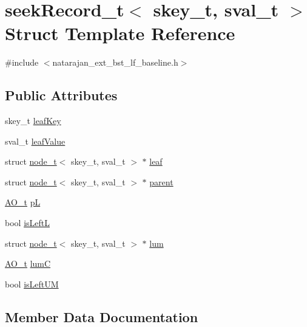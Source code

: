 \hypertarget{structseekRecord__t}{}\section{seek\+Record\+\_\+t$<$ skey\+\_\+t, sval\+\_\+t $>$ Struct Template Reference}
\label{structseekRecord__t}


{\ttfamily \#include $<$natarajan\+\_\+ext\+\_\+bst\+\_\+lf\+\_\+baseline.\+h$>$}

\subsection*{Public Attributes}
\begin{DoxyCompactItemize}
\item 
skey\+\_\+t \hyperlink{structseekRecord__t_a242a55734b296c6b87d55848277b61ee}{leaf\+Key}
\item 
sval\+\_\+t \hyperlink{structseekRecord__t_a0dcdcf40b44d819c423485031c192da0}{leaf\+Value}
\item 
struct \hyperlink{structnode__t}{node\+\_\+t}$<$ skey\+\_\+t, sval\+\_\+t $>$ $\ast$ \hyperlink{structseekRecord__t_a05edd77abc8e8960567d3dcc11faa6da}{leaf}
\item 
struct \hyperlink{structnode__t}{node\+\_\+t}$<$ skey\+\_\+t, sval\+\_\+t $>$ $\ast$ \hyperlink{structseekRecord__t_a7ff4a49b56e97553713f4ffa9ebb9762}{parent}
\item 
\hyperlink{atomic__ops_8h_a5225fef4d9eee821e82382cd269160dd}{A\+O\+\_\+t} \hyperlink{structseekRecord__t_a9b2f8a0ea21818115cd1df8bd43e3805}{pL}
\item 
bool \hyperlink{structseekRecord__t_a9ef03a6e44702813747a68e7ca743e14}{is\+LeftL}
\item 
struct \hyperlink{structnode__t}{node\+\_\+t}$<$ skey\+\_\+t, sval\+\_\+t $>$ $\ast$ \hyperlink{structseekRecord__t_ae1253c37644bed48ae50a7fbc10c8604}{lum}
\item 
\hyperlink{atomic__ops_8h_a5225fef4d9eee821e82382cd269160dd}{A\+O\+\_\+t} \hyperlink{structseekRecord__t_a1849a6fcb4ef24205344d35670ba56a3}{lumC}
\item 
bool \hyperlink{structseekRecord__t_aaea126d180e89701b44b673cd2d30d36}{is\+Left\+UM}
\end{DoxyCompactItemize}


\subsection{Member Data Documentation}
\mbox{\label{structseekRecord__t_a9ef03a6e44702813747a68e7ca743e14}} 
